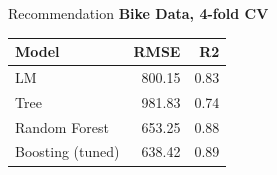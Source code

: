 \documentclass[11pt,compress,t,notes=noshow, aspectratio=169, xcolor=table]{beamer}
\begin{document}
\begin{frame}{Recommendation}
\centering \textbf{Bike Data, 4-fold CV}
\begin{table}[ht]
\centering
\begin{tabular}{lrr}
  \hline
Model & RMSE & R2 \\ 
  \hline
LM & 800.15 & 0.83 \\ 
  Tree & 981.83 & 0.74 \\ 
  Random Forest & 653.25 & 0.88 \\ 
  Boosting (tuned) & 638.42 & 0.89 \\ 
   \hline
\end{tabular}
\end{table}
\end{frame}


\endlecture
\end{document}
